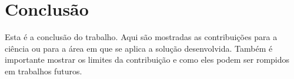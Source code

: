 \chapter{Conclusão}
\label{Conclusao}

Esta é a conclusão do trabalho. 
Aqui são mostradas as contribuições para a ciência ou para a área em que se aplica a solução desenvolvida.
Também é importante mostrar os limites da contribuição e como eles podem ser rompidos em trabalhos futuros.